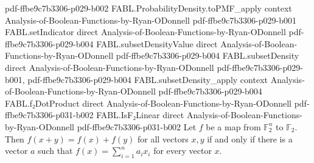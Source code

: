 \begin{theorem}
{    pdf-ffbe9c7b3306-p029-b002}
\proofstep
  {FABL.ProbabilityDensity.toPMF_apply}
  {context}
  {Analysis-of-Boolean-Functions-by-Ryan-ODonnell}
  {pdf-ffbe9c7b3306-p029-b001}
\proofstep
  {FABL.setIndicator}
  {direct}
  {Analysis-of-Boolean-Functions-by-Ryan-ODonnell}
  {pdf-ffbe9c7b3306-p029-b004}
\proofstep
  {FABL.subsetDensityValue}
  {direct}
  {Analysis-of-Boolean-Functions-by-Ryan-ODonnell}
  {pdf-ffbe9c7b3306-p029-b004}
\proofstep
  {FABL.subsetDensity}
  {direct}
  {Analysis-of-Boolean-Functions-by-Ryan-ODonnell}
  {pdf-ffbe9c7b3306-p029-b001,
    pdf-ffbe9c7b3306-p029-b004}
\proofstep
  {FABL.subsetDensity_apply}
  {context}
  {Analysis-of-Boolean-Functions-by-Ryan-ODonnell}
  {pdf-ffbe9c7b3306-p029-b004}
\proofstep
  {FABL.f₂DotProduct}
  {direct}
  {Analysis-of-Boolean-Functions-by-Ryan-ODonnell}
  {pdf-ffbe9c7b3306-p031-b002}
\proofstep
  {FABL.IsF₂Linear}
  {direct}
  {Analysis-of-Boolean-Functions-by-Ryan-ODonnell}
  {pdf-ffbe9c7b3306-p031-b002}
Let $f$ be a map from $\mathbb{F}_2^n$ to $\mathbb{F}_2$.
Then $f(x+y)=f(x)+f(y)$ for all vectors $x,y$ if and only if there is a vector $a$ such
that $f(x)=\sum_{i=1}^{n} a_i x_i$ for every vector $x$.
\end{theorem}

